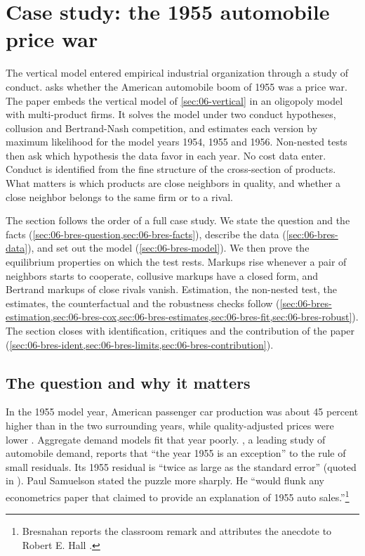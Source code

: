 \section{Case study: the 1955 automobile price war}\label{sec:06-bresnahan}

The vertical model entered empirical industrial organization through a study of conduct.
\citet{Bresnahan1987} asks whether the American automobile boom of 1955 was a price war. The paper embeds the
vertical model of \cref{sec:06-vertical} in an oligopoly model with multi-product firms. It solves the model under
two conduct hypotheses, collusion and Bertrand-Nash competition, and estimates each version by maximum likelihood
for the model years 1954, 1955 and 1956. Non-nested tests then ask which hypothesis the data favor in each year. No
cost data enter. Conduct is identified from the fine structure of the cross-section of products. What matters is
which products are close neighbors in quality, and whether a close neighbor belongs to the same firm or to a rival.

The section follows the order of a full case study. We state the question and the facts
(\cref{sec:06-bres-question,sec:06-bres-facts}), describe the data (\cref{sec:06-bres-data}), and set out the
model (\cref{sec:06-bres-model}). We then prove the equilibrium properties on which the test rests. Markups rise
whenever a pair of neighbors starts to cooperate, collusive markups have a closed form, and Bertrand markups of
close rivals vanish. Estimation, the non-nested test, the estimates, the counterfactual and the robustness checks
follow (\cref{sec:06-bres-estimation,sec:06-bres-cox,sec:06-bres-estimates,sec:06-bres-fit,sec:06-bres-robust}).
The section closes with identification, critiques and the contribution of the paper
(\cref{sec:06-bres-ident,sec:06-bres-limits,sec:06-bres-contribution}).

\subsection{The question and why it matters}\label{sec:06-bres-question}

In the 1955 model year, American passenger car production was about 45 percent higher than in the two
surrounding years, while quality-adjusted prices were lower \citep[p.~457]{Bresnahan1987}. Aggregate demand models
fit that year poorly. \citet[pp.~168--169]{Chow1960}, a leading study of automobile demand, reports that ``the
year 1955 is an exception'' to the rule of small residuals. Its 1955 residual is ``twice as large as the standard
error'' (quoted in \citealp[footnote~1]{Bresnahan1987}). Paul Samuelson stated the puzzle more
sharply. He ``would flunk any econometrics paper that claimed to provide an explanation of 1955 auto
sales.''\footnote{Bresnahan reports the classroom remark and attributes the anecdote to Robert E. Hall
\citep[footnote~2]{Bresnahan1987}.}

